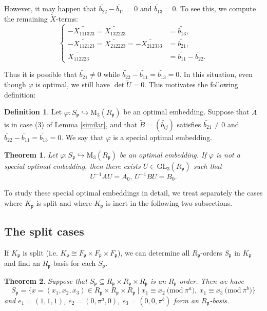 \documentclass[12pt]{article}
\theoremstyle{plain}
\newtheorem{theorem}{Theorem}[section]
\theoremstyle{definition}
\newtheorem{definition}{Definition}[section]
\theoremstyle{remark}
\begin{document}
However, it may happen that $\widetilde{b_{22}}-\widetilde{b_{11}}=0$ and $\widetilde{b_{13}}=0$. To see this, we compute the remaining $\widetilde{X}$-terms:
$$\left\{
\begin{aligned}
-\widetilde{X_{111323}}=\widetilde{X_{132223}}&=\widetilde{b_{13}}, \\
-\widetilde{X_{112123}}=\widetilde{X_{212223}}=-\widetilde{X_{212333}}&=\widetilde{b_{21}}, \\
\widetilde{X_{112223}}&=\widetilde{b_{11}}-\widetilde{b_{22}}.
\end{aligned}
\right.$$

Thus it is possible that $\widetilde{b_{21}}\neq 0$ while $\widetilde{b_{22}}-\widetilde{b_{11}}=\widetilde{b_{13}}=0$. In this situation, even though $\varphi$ is optimal, we still have $\det \widetilde{U}=0$. This motivates the following definition:

\begin{definition}
Let $\varphi : S_\mathfrak{p}\hookrightarrow \mathrm{M}_3(R_\mathfrak{p})$ be an optimal embedding. Suppose that $\widetilde{A}$ is in case (3) of Lemma \ref{similar}, and that $\widetilde{B}=(\widetilde{b_{ij}})$ satisfies $\widetilde{b_{21}}\neq 0$ and $\widetilde{b_{22}}-\widetilde{b_{11}}=\widetilde{b_{13}}=0$. We say that $\varphi$ is a special optimal embedding.
\end{definition}

\begin{theorem}\label{nnormal}
Let $\varphi : S_\mathfrak{p}\hookrightarrow \mathrm{M}_3(R_\mathfrak{p})$ be an optimal embedding. If $\varphi$ is not a special optimal embedding, then there exists $U\in \mathrm{GL}_3(R_\mathfrak{p})$ such that
$$U^{-1}AU = A_0,\  U^{-1}BU = B_0.$$
\end{theorem}

To study these special optimal embeddings in detail, we treat separately the cases where $K_\mathfrak{p}$ is split and where $K_\mathfrak{p}$ is inert in the following two subsections.


\subsection{The split cases}
If $K_\mathfrak{p}$ is split (i.e. $K_\mathfrak{p}\cong F_\mathfrak{p}\times F_\mathfrak{p}\times F_\mathfrak{p}$), we can determine all $R_\mathfrak{p}$-orders $S_\mathfrak{p}$ in $K_\mathfrak{p}$ and find an $R_\mathfrak{p}$-basis for each $S_\mathfrak{p}$.

\begin{theorem}
Suppose that $S_\mathfrak{p}\subseteq R_\mathfrak{p}\times R_\mathfrak{p}\times R_\mathfrak{p}$ is an $R_\mathfrak{p}$-order. Then we have
$$
S_\mathfrak{p}=\{x=(x_1,x_2,x_3)\in R_\mathfrak{p}\times R_\mathfrak{p}\times R_\mathfrak{p}\mid x_1\equiv x_2 \ \mathrm{(mod}\ \pi^a),\ x_1 \equiv x_3 \ \mathrm{(mod}\ \pi^b)\}
$$
and $e_1=(1,1,1)$, $e_2=(0,\pi^a,0)$, $e_3=(0,0,\pi^b)$ form an $R_\mathfrak{p}$-basis.
\end{theorem}
\end{document}
